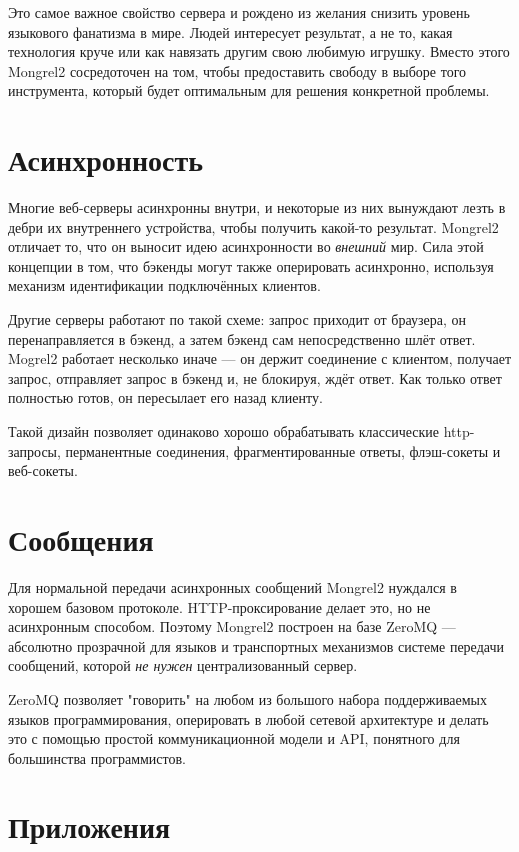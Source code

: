 Это самое важное свойство сервера и рождено из желания снизить уровень языкового фанатизма
в мире. Людей интересует результат, а не то, какая технология круче или как навязать
другим свою любимую игрушку. Вместо этого Mongrel2 сосредоточен на том, чтобы
предоставить свободу в выборе того инструмента, который будет оптимальным для решения
конкретной проблемы.

\section{Асинхронность}

Многие веб-серверы асинхронны внутри, и некоторые из них вынуждают лезть в дебри их
внутреннего устройства, чтобы получить какой-то результат. Mongrel2 отличает то,
что он выносит идею асинхронности во \emph{внешний} мир. Сила этой концепции в том,
что бэкенды могут также оперировать асинхронно, используя механизм идентификации
подключённых клиентов.

Другие серверы работают по такой схеме: запрос приходит от браузера, он перенаправляется
в бэкенд, а затем бэкенд сам непосредственно шлёт ответ. Mogrel2 работает несколько иначе ---
он держит соединение с клиентом, получает запрос, отправляет запрос в бэкенд и, не блокируя,
ждёт ответ. Как только ответ полностью готов, он пересылает его назад клиенту.

Такой дизайн позволяет одинаково хорошо обрабатывать классические http-запросы, перманентные
соединения, фрагментированные ответы, флэш-сокеты и веб-сокеты.

\section{Сообщения}

Для нормальной передачи асинхронных сообщений Mongrel2 нуждался в хорошем
базовом протоколе. HTTP-проксирование делает это, но не асинхронным способом.
Поэтому Mongrel2 построен на базе ZeroMQ --- абсолютно прозрачной для языков и
транспортных механизмов системе передачи сообщений, которой \emph{не нужен}
централизованный сервер.

ZeroMQ позволяет "говорить" на любом из большого набора поддерживаемых языков
программирования, оперировать в любой сетевой архитектуре и делать это с помощью
простой коммуникационной модели и API, понятного для большинства программистов.

\section{Приложения}

